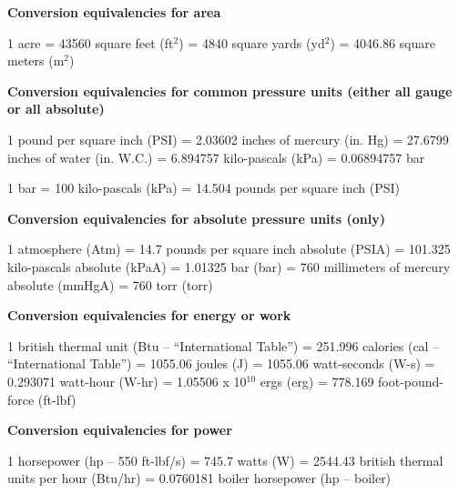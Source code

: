 \goodbreak 
{\bf Conversion equivalencies for area}

\vskip 5pt {\narrower \noindent \baselineskip5pt
1 acre = 43560 square feet (ft$^{2}$) = 4840 square yards (yd$^{2}$) = 4046.86 square meters (m$^{2}$)
\par} \vskip 10pt
\bigskip 
 

\goodbreak 
{\bf Conversion equivalencies for common pressure units (either all gauge or all absolute)}

\vskip 5pt {\narrower \noindent \baselineskip5pt
1 pound per square inch (PSI) = 2.03602 inches of mercury (in. Hg) = 27.6799 inches of water (in. W.C.) = 6.894757 kilo-pascals (kPa) = 0.06894757 bar
\par} 
\medskip 
 
{\narrower \noindent \baselineskip5pt
1 bar = 100 kilo-pascals (kPa) = 14.504 pounds per square inch (PSI) 
\par} \vskip 10pt
\bigskip 


\goodbreak 
{\bf Conversion equivalencies for absolute pressure units (only)}

\vskip 5pt {\narrower \noindent \baselineskip5pt
1 atmosphere (Atm) = 14.7 pounds per square inch absolute (PSIA) = 101.325 kilo-pascals absolute (kPaA) = 1.01325 bar (bar) = 760 millimeters of mercury absolute (mmHgA) = 760 torr (torr)
\par} \vskip 10pt
\bigskip 


\goodbreak 
{\bf Conversion equivalencies for energy or work}

\vskip 5pt {\narrower \noindent \baselineskip5pt
1 british thermal unit (Btu -- ``International Table'') = 251.996 calories (cal -- ``International Table'') = 1055.06 joules (J) = 1055.06 watt-seconds (W-s) = 0.293071 watt-hour (W-hr) = 1.05506 x 10$^{10}$ ergs (erg) = 778.169 foot-pound-force (ft-lbf) 
\par} \vskip 10pt
\bigskip 
 

\goodbreak 
{\bf Conversion equivalencies for power}

\vskip 5pt {\narrower \noindent \baselineskip5pt
1 horsepower (hp -- 550 ft-lbf/s) = 745.7 watts (W) = 2544.43 british thermal units per hour (Btu/hr) = 0.0760181 boiler horsepower (hp -- boiler)
\par} \vskip 10pt
\bigskip 
 

